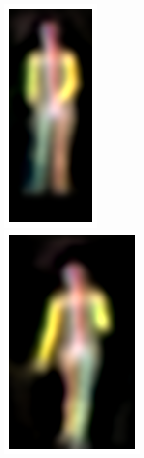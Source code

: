 \begin{figure}[t!]
    \includegraphics[height=\flowhh]{resources/Human_Poses/qualitative/svs-1}
    \hfill
    \includegraphics[height=\flowhh]{resources/Human_Poses/qualitative/svs-2}
    \hfill

\end{figure}
